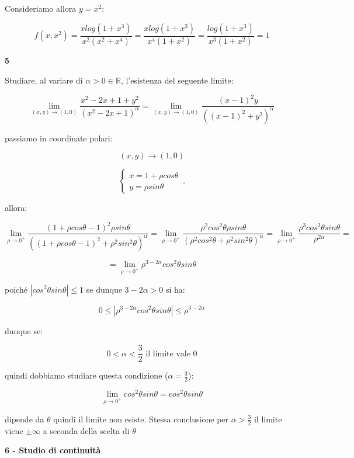 \documentclass[11pt]{article}
\begin{document}
Consideriamo allora $y=x^{2}$:

\[
    f(x,x^{2})= \frac{xlog(1+x^{3})}{x^{2}(x^{2}+x^{4})} = \frac{xlog(1+x^{3})}{x^{4}(1+x^{2})}= \frac{log(1+x^{3})}{x^{3}(1+x^{2})} = 1
\]
 

\textbf{5} 

Studiare, al variare di $\alpha >0 \in \mathbb{R}$, l'esistenza del seguente limite:

\[
    \lim_{ (x,y) \to (1,0) } \frac{x^{2}-2x+1+y^{2}}{(x^{2}-2x+1)^{\alpha}} = \lim_{ (x,y) \to (1,0) } \frac{(x-1)^{2}y}{((x-1)^{2}+y^{2})^{\alpha}} 
\]

passiamo in coordinate polari:

\[
    (x,y) \rightarrow (1,0)
\]

\begin{equation}
    \begin{cases}
           x = 1+\rho cos \theta\\
           y = \rho sin\theta
    \end{cases}\,.
\end{equation}


allora:

\[
    \lim_{ \rho \to 0^{+} } \frac{(1 + \rho cos\theta -1 )^{2} \rho sin\theta}{((1+\rho cos\theta -1)^{2}+\rho^{2}sin^{2}\theta)^{\alpha}} = \lim_{ \rho \to 0^{+} } \frac{\rho^{2}cos^{2}\theta\rho sin\theta}{(\rho^{2}cos^{2}\theta+\rho^{2}sin^{2}\theta)^{\alpha}} = \lim_{ \rho \to 0^{+} } \frac{\rho^{3}cos^{2}\theta sin \theta}{\rho ^{2 \alpha}} =
\]


\[
    = \lim_{ \rho \to 0^{+} } \rho^{3-2 \alpha} cos^{2}\theta sin \theta
\]

poiché $|cos^{2}\theta sin\theta|\le 1$ se dunque $3-2 \alpha >0$ si ha:

\[
    0 \le |\rho^{3-2 \alpha}cos^{2}\theta sin \theta | \le \rho^{3-2 \alpha}
\]


dunque se:

\[
    0 < \alpha < \frac{3}{2} \text{ il limite vale 0}
\]

quindi dobbiamo studiare questa condizione ($\alpha=\frac{3}{2}$):

\[
    \lim_{ \rho \to 0^{+} } cos^{2}\theta sin \theta = cos^{2}\theta sin \theta
\]

dipende da $\theta$ quindi il limite non esiste. Stessa conclusione per $\alpha>\frac{3}{2}$ il limite viene $\pm \infty$ a seconda della scelta di $\theta$

\textbf{6 - Studio di continuità}
\end{document}
